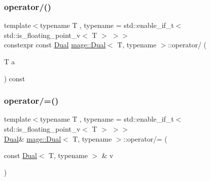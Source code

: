 \subsubsection{\texorpdfstring{operator/()}{operator/()}\hspace{0.1cm}{\footnotesize\ttfamily [2/2]}}
{\footnotesize\ttfamily template$<$typename T , typename  = std\+::enable\+\_\+if\+\_\+t$<$ std\+::is\+\_\+floating\+\_\+point\+\_\+v$<$ T $>$ $>$$>$ \\
constexpr const \mbox{\hyperlink{structmage_1_1_dual}{Dual}} \mbox{\hyperlink{structmage_1_1_dual}{mage\+::\+Dual}}$<$ T, typename $>$\+::operator/ (\begin{DoxyParamCaption}\item[{T}]{a }\end{DoxyParamCaption}) const\hspace{0.3cm}{\ttfamily [noexcept]}}

\mbox{\label{structmage_1_1_dual_a49cb40f55ab7a8b80071e1ac509b5c7a}} 
\subsubsection{\texorpdfstring{operator/=()}{operator/=()}\hspace{0.1cm}{\footnotesize\ttfamily [1/2]}}
{\footnotesize\ttfamily template$<$typename T , typename  = std\+::enable\+\_\+if\+\_\+t$<$ std\+::is\+\_\+floating\+\_\+point\+\_\+v$<$ T $>$ $>$$>$ \\
\mbox{\hyperlink{structmage_1_1_dual}{Dual}}\& \mbox{\hyperlink{structmage_1_1_dual}{mage\+::\+Dual}}$<$ T, typename $>$\+::operator/= (\begin{DoxyParamCaption}\item[{const \mbox{\hyperlink{structmage_1_1_dual}{Dual}}$<$ T, typename $>$ \&}]{v }\end{DoxyParamCaption})\hspace{0.3cm}{\ttfamily [noexcept]}}

\mbox{\label{structmage_1_1_dual_aa88787b681e0eacf44b72f2ebd37d813}} 
